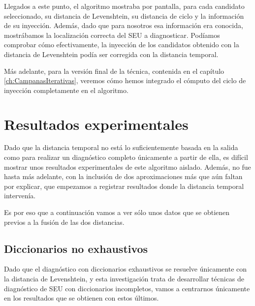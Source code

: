 Llegados a este punto, el algoritmo mostraba por pantalla, para cada candidato
seleccionado, su distancia de Levenshtein, su distancia de ciclo y la información
de su inyección. Además, dado que para nosotros esa información era conocida,
mostrábamos la localización correcta del \gls{SEU} a diagnosticar. Podíamos
comprobar cómo efectivamente, la inyección de los candidatos obtenido con la
distancia de Levenshtein podía ser corregida con la distancia temporal.

Más adelante, para la versión final de la técnica, contenida en el capítulo
\ref{ch:CampanasIterativas}, veremos cómo hemos integrado el cómputo del ciclo de
inyección completamente en el algoritmo.

\section{Resultados experimentales}
\label{sec:CycleResults}
Dado que la distancia temporal no está lo suficientemente basada en la salida 
como para realizar un diagnóstico completo únicamente a partir de ella, es difícil
mostrar unos resultados experimentales de este algoritmo aislado. Además, no fue
hasta más adelante, con la inclusión de dos aproximaciones más que aún faltan por
explicar, que empezamos a registrar resultados donde la distancia temporal 
intervenía.

Es por eso que a continuación vamos a ver sólo unos datos que se obtienen previos
a la fusión de las dos distancias.

\subsection{Diccionarios no exhaustivos}
\label{subsec:CycDicNoExhaust}
Dado que el diagnóstico con diccionarios exhaustivos se resuelve únicamente con la
distancia de Levenshtein, y esta investigación trata de desarrollar técnicas de
diagnóstico de \gls{SEU} con diccionarios incompletos, vamos a centrarnos
únicamente en los resultados que se obtienen con estos últimos.

